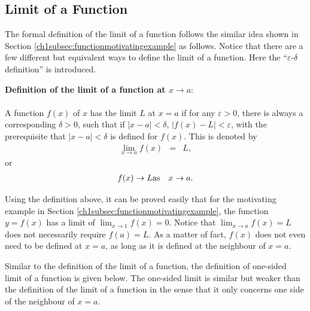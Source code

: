 \subsection{Limit of a Function} \label{ch1subsec:definationoflimitoffunction}

The formal definition of the limit of a function follows the similar idea shown in Section \ref{ch1subsec:functionmotivatingexample} as follows. Notice that there are a few different but equivalent ways to define the limit of a function. Here the ``$\varepsilon$-$\delta$ definition'' is introduced.

\begin{VF}
\textbf{Definition of the limit of a function at $x\rightarrow a$}:
\\
\\
\noindent A function $f(x)$ of $x$ has the limit $L$ at $x=a$ if for any $\varepsilon > 0$, there is always a corresponding $\delta > 0$, such that if $|x-a|<\delta$, $|f(x)-L| < \varepsilon$, with the prerequisite that $|x-a|<\delta$ is defined for $f(x)$. This is denoted by
\begin{eqnarray}
   \lim_{x\rightarrow a} f(x) &=& L, \nonumber
\end{eqnarray}
or
\begin{eqnarray}
  f(x) \rightarrow L & \textup{as} & x \rightarrow a. \nonumber
\end{eqnarray}
\end{VF}

Using the definition above, it can be proved easily that for the motivating example in Section \ref{ch1subsec:functionmotivatingexample}, the function $y=f(x)$ has a limit of $\lim_{x\rightarrow 1}f(x)=0$. Notice that $\lim_{x\rightarrow a}f(x)=L$ does not necessarily require $f(a)=L$. As a matter of fact, $f(x)$ does not even need to be defined at $x=a$, as long as it is defined at the neighbour of $x=a$.

Similar to the definition of the limit of a function, the definition of one-sided limit of a function is given below. The one-sided limit is similar but weaker than the definition of the limit of a function in the sense that it only concerns one side of the neighbour of $x=a$.

